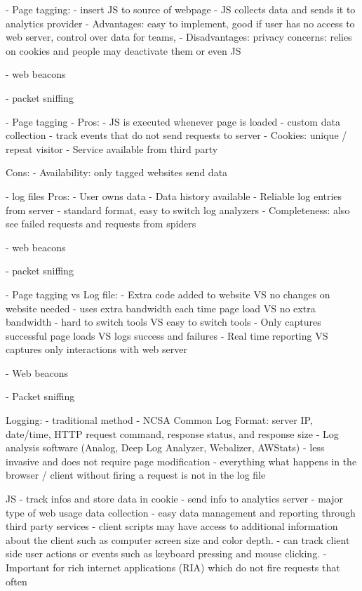 - Page tagging:
- insert JS to source of webpage
- JS collects data and sends it to analytics provider
- Advantages: easy to implement, good if user has no access to web server, control over data for teams, 
- Disadvantages: privacy concerns: relies on cookies and people may deactivate them or even JS

- web beacons

- packet sniffing


- Page tagging
- Pros:
- JS is executed whenever page is loaded
- custom data collection
- track events that do not send requests to server
- Cookies: unique / repeat visitor
- Service available from third party

Cons:
- Availability: only tagged websites send data


- log files
Pros:
- User owns data
- Data history available
- Reliable log entries from server
- standard format, easy to switch log analyzers
- Completeness: also see failed requests and requests from spiders

- web beacons

- packet sniffing




- Page tagging vs Log file:
- Extra code added to website VS no changes on website needed
- uses extra bandwidth each time page load VS no extra bandwidth
- hard to switch tools VS easy to switch tools
- Only captures successful page loads VS logs success and failures
- Real time reporting VS captures only interactions with web server

- Web beacons

- Packet sniffing


Logging:
- traditional method
- NCSA Common Log Format: server IP, date/time, HTTP request command, response status, and response size
- Log analysis software (Analog, Deep Log Analyzer, Webalizer, AWStats)
- less invasive and does not require page modification
- everything what happens in the browser / client without firing a request is not in the log file

JS
- track infos and store data in cookie
- send info to analytics server
- major type of web usage data collection
- easy data management and reporting through third party services
- client scripts may have access to additional information about the client such as computer screen size and color depth.
- can track client side user actions or events such as keyboard pressing and mouse clicking.
- Important for rich internet applications (RIA) which do not fire requests that often

